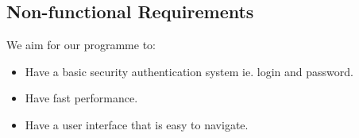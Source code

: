\subsection{Non-functional Requirements}
We aim for our programme to:
\begin{itemize}
    \item Have a basic security authentication system ie. login and password.
    \item Have fast performance.
    \item Have a user interface that is easy to navigate.
\end{itemize}
